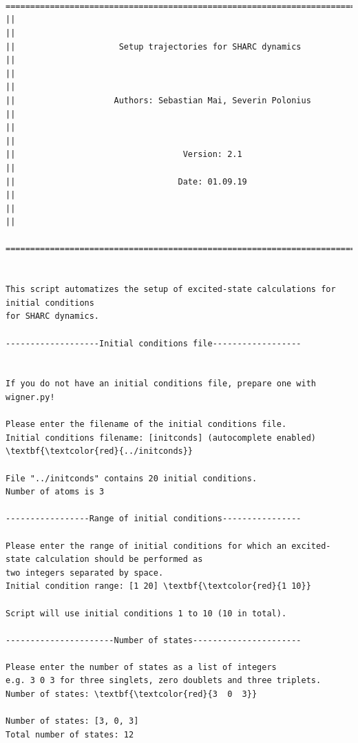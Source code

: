 \documentclass[a4paper,11pt,DIV=15,openany]{scrbook}
\begin{document}
\begin{oframed}
\footnotesize\begin{Verbatim}[commandchars=\\\{\}]


  ================================================================================
||                                                                                ||
||                     Setup trajectories for SHARC dynamics                      ||
||                                                                                ||
||                    Authors: Sebastian Mai, Severin Polonius                    ||
||                                                                                ||
||                                  Version: 2.1                                  ||
||                                 Date: 01.09.19                                 ||
||                                                                                ||
  ================================================================================


This script automatizes the setup of excited-state calculations for initial conditions
for SHARC dynamics.
  
-------------------Initial conditions file------------------


If you do not have an initial conditions file, prepare one with wigner.py!

Please enter the filename of the initial conditions file.
Initial conditions filename: [initconds] (autocomplete enabled) \textbf{\textcolor{red}{../initconds}}

File "../initconds" contains 20 initial conditions.
Number of atoms is 3

-----------------Range of initial conditions----------------

Please enter the range of initial conditions for which an excited-state calculation should be performed as 
two integers separated by space.
Initial condition range: [1 20] \textbf{\textcolor{red}{1 10}}

Script will use initial conditions 1 to 10 (10 in total).

----------------------Number of states----------------------

Please enter the number of states as a list of integers
e.g. 3 0 3 for three singlets, zero doublets and three triplets.
Number of states: \textbf{\textcolor{red}{3  0  3}}

Number of states: [3, 0, 3]
Total number of states: 12


\end{Verbatim}
\end{oframed}
\end{document}
